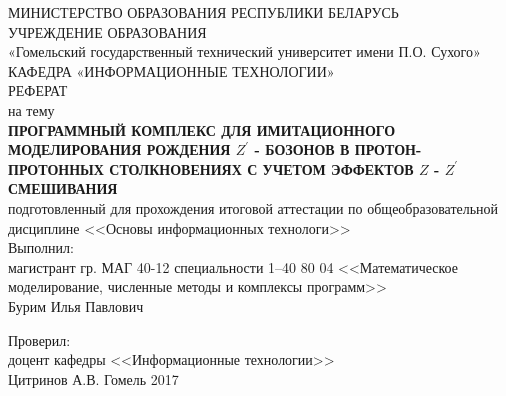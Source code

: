 \begin{titlepage}
	\large
	\begin{center}
		\vspace{3mm}
		МИНИСТЕРСТВО ОБРАЗОВАНИЯ РЕСПУБЛИКИ БЕЛАРУСЬ\\
		УЧРЕЖДЕНИЕ ОБРАЗОВАНИЯ\\
		«Гомельский государственный технический университет имени П.О. Сухого»\\
		\vspace{10mm}
		КАФЕДРА «ИНФОРМАЦИОННЫЕ ТЕХНОЛОГИИ»\\
		\vspace{30mm}
		РЕФЕРАТ\\
		на тему\\
			\textbf{\MakeTextUppercase{ Программный комплекс для имитационного моделирования рождения $Z^\prime$ - бозонов в протон-протонных столкновениях с учетом эффектов $Z$ - $Z^\prime$ смешивания
		}}\\
	\vspace{5mm}
		подготовленный для прохождения итоговой аттестации 
		по общеобразовательной дисциплине 
		<<Основы информационных технологи>>\\
	\vspace{40mm}
		Выполнил:\\
		магистрант гр. МАГ 40-12
		специальности 1–40 80 04 <<Математическое моделирование, численные методы и комплексы программ>>\\
		Бурим Илья Павлович
		
	\vspace{15mm}
		Проверил:\\
		доцент кафедры <<Информационные технологии>>\\
		Цитринов А.В.
	\vfill
		Гомель 2017
	\end{center}
\end{titlepage}
